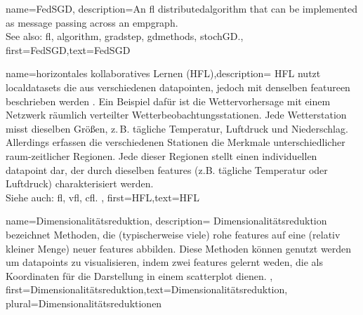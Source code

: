{name={FedSGD},
	description={An \gls{fl} \gls{distributedalgorithm} that 
		can be implemented as message passing across an \gls{empgraph}. 
		\\ 
		See also: \gls{fl}, \gls{algorithm}, \gls{gradstep}, \gls{gdmethods}, \gls{stochGD}.},
	first={FedSGD},text={FedSGD}

{name={horizontales kollaboratives Lernen (HFL)},description=
	{HFL nutzt \glspl{localdataset} die aus verschiedenen
		\gls{datapoint}en, jedoch mit denselben \gls{feature}en beschrieben werden \cite{HFLChapter2020}.
	Ein Beispiel dafür ist die Wettervorhersage mit einem Netzwerk räumlich verteilter 
	Wetterbeobachtungsstationen. Jede Wetterstation misst dieselben Größen, 
	z. B. tägliche Temperatur, Luftdruck und Niederschlag.
		Allerdings erfassen die verschiedenen Stationen die Merkmale unterschiedlicher 
	raum-zeitlicher Regionen.
	Jede dieser Regionen stellt einen individuellen  \gls{datapoint}  dar, 
	der durch dieselben \glspl{feature}  (z.B. tägliche Temperatur oder Luftdruck) charakterisiert werden. \\
	Siehe auch: \gls{fl}, \gls{vfl}, \gls{cfl}. },
	first={HFL},text={HFL}
}

{name={Dimensionalitätsreduktion},
	description= Dimensionalitätsreduktion  bezeichnet Methoden, die 
	(typischerweise viele) rohe  \glspl{feature} auf eine (relativ kleiner Menge)  neuer  \glspl{feature} abbilden.
	Diese Methoden können genutzt werden um \glspl{datapoint} zu visualisieren, indem zwei  \glspl{feature}
	gelernt weden, die als Koordinaten für die Darstellung in einem \gls{scatterplot} dienen. },
	 first={Dimensionalitätsreduktion},text={Dimensionalitätsreduktion}, plural={Dimensionalitätsreduktionen}
} 

